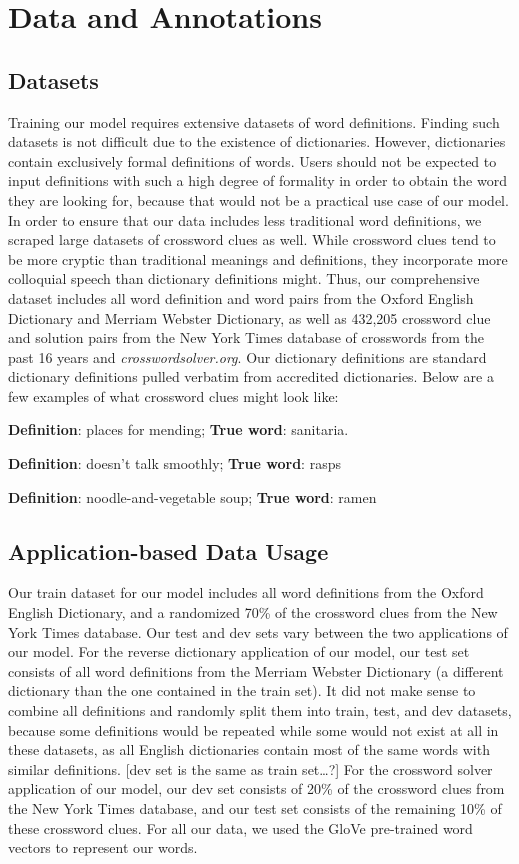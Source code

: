\documentclass{article} %
\begin{document}
\section{Data and Annotations}

\subsection{Datasets}
Training our model requires extensive datasets of word definitions. Finding such datasets is not difficult due to the existence of dictionaries. However, dictionaries contain exclusively formal definitions of words. Users should not be expected to input definitions with such a high degree of formality in order to obtain the word they are looking for, because that would not be a practical use case of our model. 
In order to ensure that our data includes less traditional word definitions, we scraped large datasets of crossword clues as well. While crossword clues tend to be more cryptic than traditional meanings and definitions, they incorporate more colloquial speech than dictionary definitions might. 
Thus, our comprehensive dataset includes all word definition and word pairs from the Oxford English Dictionary and Merriam Webster Dictionary, as well as 432,205 crossword clue and solution pairs from the New York Times database of crosswords from the past 16 years and \emph{crosswordsolver.org}. 
Our dictionary definitions are standard dictionary definitions pulled verbatim from accredited dictionaries. Below are a few examples of what crossword clues might look like:

\textbf{Definition}: places for mending; \textbf{True word}: sanitaria. 

\textbf{Definition}: doesn’t talk smoothly; \textbf{True word}: rasps

\textbf{Definition}: noodle-and-vegetable soup; \textbf{True word}: ramen

\subsection{Application-based Data Usage}
Our train dataset for our model includes all word definitions from the Oxford English Dictionary, and a randomized 70\% of the crossword clues from the New York Times database. Our test and dev sets vary between the two applications of our model.
For the reverse dictionary application of our model, our test set consists of all word definitions from the Merriam Webster Dictionary (a different dictionary than the one contained in the train set). It did not make sense to combine all definitions and randomly split them into train, test, and dev datasets, because some definitions would be repeated while some would not exist at all in these datasets, as all English dictionaries contain most of the same words with similar definitions. [dev set is the same as train set…?]
For the crossword solver application of our model, our dev set consists of 20\% of the crossword clues from the New York Times database, and our test set consists of the remaining 10\% of these crossword clues.
For all our data, we used the GloVe pre-trained word vectors to represent our words.
\end{document}
